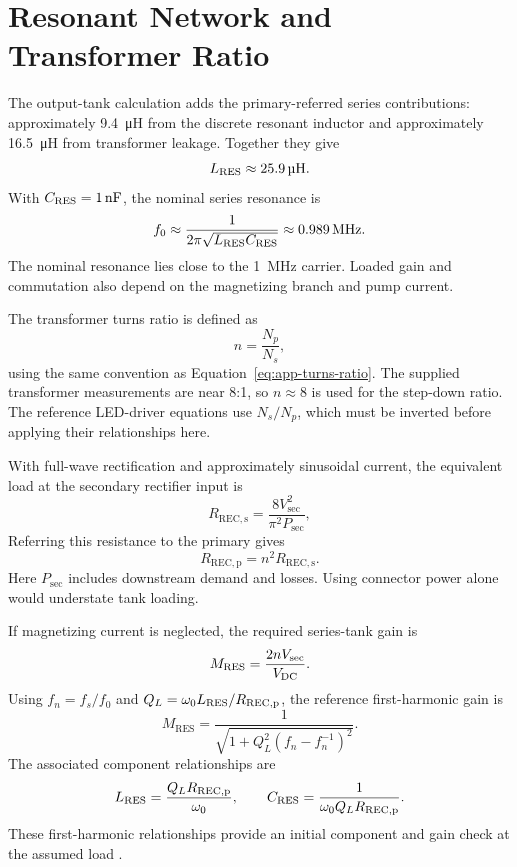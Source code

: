 \section{Resonant Network and Transformer Ratio}
\label{sec:analysis-resonant}

The output-tank calculation adds the primary-referred series contributions: approximately \SI{9.4}{\micro\henry} from the discrete resonant inductor and approximately \SI{16.5}{\micro\henry} from transformer leakage. Together they give
\begin{equation}
\LRES\approx\SI{25.9}{\micro\henry}.
\end{equation}
With \(C_{\mathrm{RES}}=\SI{1}{\nano\farad}\), the nominal series resonance is
\begin{equation}
f_0\approx\frac{1}{2\pi\sqrt{L_{\mathrm{RES}}C_{\mathrm{RES}}}}
\approx\SI{0.989}{\mega\hertz}.
\end{equation}
The nominal resonance lies close to the \SI{1}{\mega\hertz} carrier. Loaded gain and commutation also depend on the magnetizing branch and pump current.

The transformer turns ratio is defined as
\begin{equation}
n=\frac{N_p}{N_s},
\end{equation}
using the same convention as Equation~\eqref{eq:app-turns-ratio}. The supplied transformer measurements are near 8:1, so \(n\approx8\) is used for the step-down ratio. The reference LED-driver equations use \(N_s/N_p\), which must be inverted before applying their relationships here.

With full-wave rectification and approximately sinusoidal current, the equivalent load at the secondary rectifier input is
\begin{equation}
R_{\mathrm{REC,s}}=\frac{8V_{\mathrm{sec}}^2}{\pi^2P_{\mathrm{sec}}},
\end{equation}
Referring this resistance to the primary gives
\begin{equation}
R_{\mathrm{REC,p}}=n^2R_{\mathrm{REC,s}}.
\end{equation}
Here \(P_{\mathrm{sec}}\) includes downstream demand and losses. Using connector power alone would understate tank loading.

If magnetizing current is neglected, the required series-tank gain is
\begin{equation}
M_{\mathrm{RES}}=\frac{2nV_{\mathrm{sec}}}{V_{\mathrm{DC}}}.
\end{equation}
Using \(f_n=f_s/f_0\) and \(Q_L=\omega_0L_{\mathrm{RES}}/R_{\mathrm{REC,p}}\), the reference first-harmonic gain is
\begin{equation}
M_{\mathrm{RES}}=
\frac{1}{\sqrt{1+Q_L^2(f_n-f_n^{-1})^2}}.
\label{eq:analysis-series-gain}
\end{equation}
The associated component relationships are
\begin{equation}
L_{\mathrm{RES}}=\frac{Q_LR_{\mathrm{REC,p}}}{\omega_0},
\qquad
C_{\mathrm{RES}}=\frac{1}{\omega_0Q_LR_{\mathrm{REC,p}}}.
\end{equation}
These first-harmonic relationships provide an initial component and gain check at the assumed load \cite{ammar2021led}.

